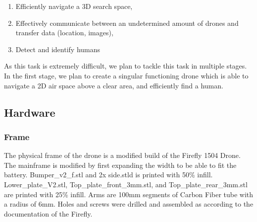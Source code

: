 \documentclass{article}
\begin{document}
\begin{enumerate}
  \item Efficiently navigate a 3D search space,
  \item Effectively communicate between an undetermined amount of drones and transfer data (location, images),
  \item Detect and identify humans
\end{enumerate}

As this task is extremely difficult, we plan to tackle this task in multiple stages. In the first stage, we plan to create a singular functioning drone which is able to navigate a 2D air space above a clear area, and efficiently find a human. 

\subsection{Hardware}
\subsubsection{Frame}
The physical frame of the drone is a modified build of the Firefly 1504 Drone. The mainframe is modified by first expanding the width to be able to fit the battery. Bumper\_v2\_f.stl and 2x side.stld is printed with 50\% infill. Lower\_plate\_V2.stl, Top\_plate\_front\_3mm.stl, and Top\_plate\_rear\_3mm.stl are printed with 25\% infill. Arms are 100mm segments of Carbon Fiber tube with a radius of 6mm. Holes and screws were drilled and assembled as according to the documentation of the Firefly.
\end{document}
